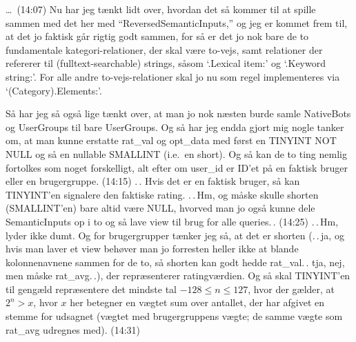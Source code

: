 \documentclass{report}
\begin{document}
\ldots\ (14:07) Nu har jeg tænkt lidt over, hvordan det så kommer til at spille sammen med det her med ``ReversedSemanticInputs,'' og jeg er kommet frem til, at det jo faktisk går rigtig godt sammen, for så er det jo nok bare de to fundamentale kategori-relationer, der skal være to-vejs, samt relationer der refererer til (fulltext-searchable) strings, såsom `.Lexical item:' og `.Keyword string:'. For alle andre to-vejs-relationer skal jo nu som regel implementeres via `(Category).Elements:'. 

Så har jeg så også lige tænkt over, at man jo nok næsten burde samle NativeBots og UserGroups til bare UserGroups. Og så har jeg endda gjort mig nogle tanker om, at man kunne erstatte rat\_val og opt\_data med først en TINYINT NOT NULL og så en nullable SMALLINT (i.e.\ en short). Og så kan de to ting nemlig fortolkes som noget forskelligt, alt efter om user\_id er ID'et på en faktisk bruger eller en brugergruppe. (14:15) .\,. Hvis det er en faktisk bruger, så kan TINYINT'en signalere den faktiske rating. .\,.\,Hm, og måske skulle shorten (SMALLINT'en) bare altid være NULL, hvorved man jo også kunne dele SemanticInputs op i to og så lave view til brug for alle queries.\,. (14:25) .\,.\,Hm, lyder ikke dumt. Og for brugergrupper tænker jeg så, at det er shorten (.\,.\,ja, og hvis man laver et view behøver man jo forresten heller ikke at blande kolonnenavnene sammen for de to, så shorten kan godt hedde rat\_val.\,. tja, nej, men måske rat\_avg.\,.), der repræsenterer ratingværdien. Og så skal TINYINT'en til gengæld repræsentere det mindste tal $-128\leq n \leq 127$, hvor der gælder, at $2^n > x$, hvor $x$ her betegner en vægtet sum over antallet, der har afgivet en stemme for udsagnet (vægtet med brugergruppens vægte; de samme vægte som rat\_avg udregnes med). (14:31)
\end{document}
